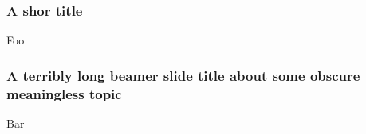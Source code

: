 \documentclass{beamer}
\begin{document}
\begin{frame}
  \frametitle{A shor title}
  Foo
\end{frame}

\begin{frame}
  \frametitle{A terribly long beamer slide title about some obscure meaningless
  topic}
  Bar
\end{frame}
\end{document}
